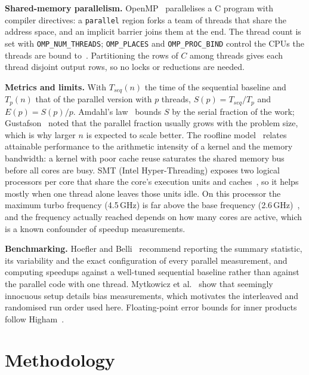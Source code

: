 \documentclass[conference,a4paper]{IEEEtran}
\begin{document}
\textbf{Shared-memory parallelism.} OpenMP~\cite{dagum1998,openmp52} parallelises a C program with
compiler directives: a \texttt{parallel} region forks a team of threads that share the address space,
and an implicit barrier joins them at the end. The thread count is set with \texttt{OMP\_NUM\_THREADS};
\texttt{OMP\_PLACES} and \texttt{OMP\_PROC\_BIND} control the CPUs the threads are bound
to~\cite{openmp52}. Partitioning the rows of $C$ among threads gives each thread disjoint output rows,
so no locks or reductions are needed.

\textbf{Metrics and limits.} With $T_{seq}(n)$ the time of the sequential baseline and $T_p(n)$ that of
the parallel version with $p$ threads, $S(p)=T_{seq}/T_p$ and $E(p)=S(p)/p$. Amdahl's
law~\cite{amdahl1967} bounds $S$ by the serial fraction of the work; Gustafson~\cite{gustafson1988}
noted that the parallel fraction usually grows with the problem size, which is why larger $n$ is
expected to scale better. The roofline model~\cite{williams2009} relates attainable performance to the
arithmetic intensity of a kernel and the memory bandwidth: a kernel with poor cache reuse saturates the
shared memory bus before all cores are busy. SMT (Intel Hyper-Threading) exposes two logical
processors per core that share the core's execution units and caches~\cite{marr2002}, so it helps
mostly when one thread alone leaves those units idle. On this processor the maximum turbo frequency
(4.5\,GHz) is far above the base frequency (2.6\,GHz)~\cite{intel9750h}, and the frequency actually
reached depends on how many cores are active, which is a known confounder of speedup measurements.

\textbf{Benchmarking.} Hoefler and Belli~\cite{hoefler2015} recommend reporting the summary statistic,
its variability and the exact configuration of every parallel measurement, and computing speedups
against a well-tuned sequential baseline rather than against the parallel code with one thread.
Mytkowicz et al.~\cite{mytkowicz2009} show that seemingly innocuous setup details bias measurements,
which motivates the interleaved and randomised run order used here. Floating-point error bounds for
inner products follow Higham~\cite{higham2002}.

\section{Methodology}
\label{sec:method}
\end{document}
